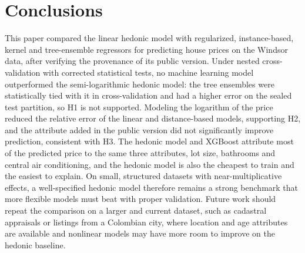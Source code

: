 \documentclass[conference]{IEEEtran}
\begin{document}
\section{Conclusions}
\label{sec:conclusions}
This paper compared the linear hedonic model with regularized, instance-based, kernel and tree-ensemble regressors for predicting house prices on the Windsor data, after verifying the provenance of its public version. Under nested cross-validation with corrected statistical tests, no machine learning model outperformed the semi-logarithmic hedonic model: the tree ensembles were statistically tied with it in cross-validation and had a higher error on the sealed test partition, so H1 is not supported. Modeling the logarithm of the price reduced the relative error of the linear and distance-based models, supporting H2, and the attribute added in the public version did not significantly improve prediction, consistent with H3. The hedonic model and XGBoost attribute most of the predicted price to the same three attributes, lot size, bathrooms and central air conditioning, and the hedonic model is also the cheapest to train and the easiest to explain. On small, structured datasets with near-multiplicative effects, a well-specified hedonic model therefore remains a strong benchmark that more flexible models must beat with proper validation. Future work should repeat the comparison on a larger and current dataset, such as cadastral appraisals or listings from a Colombian city, where location and age attributes are available and nonlinear models may have more room to improve on the hedonic baseline.



\end{document}
